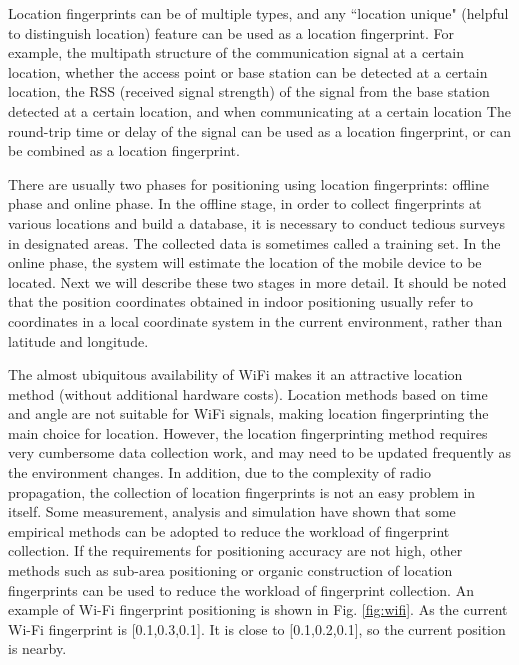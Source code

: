 \documentclass[conference]{IEEEtran}
\begin{document}
Location fingerprints can be of multiple types, and any ``location unique" (helpful to distinguish location) feature can be used as a location fingerprint. For example, the multipath structure of the communication signal at a certain location, whether the access point or base station can be detected at a certain location, the RSS (received signal strength) of the signal from the base station detected at a certain location, and when communicating at a certain location The round-trip time or delay of the signal can be used as a location fingerprint, or can be combined as a location fingerprint.

There are usually two phases for positioning using location fingerprints: offline phase and online phase. In the offline stage, in order to collect fingerprints at various locations and build a database, it is necessary to conduct tedious surveys in designated areas. The collected data is sometimes called a training set. In the online phase, the system will estimate the location of the mobile device to be located. Next we will describe these two stages in more detail. It should be noted that the position coordinates obtained in indoor positioning usually refer to coordinates in a local coordinate system in the current environment, rather than latitude and longitude.

The almost ubiquitous availability of WiFi makes it an attractive location method (without additional hardware costs). Location methods based on time and angle are not suitable for WiFi signals, making location fingerprinting the main choice for location. However, the location fingerprinting method requires very cumbersome data collection work, and may need to be updated frequently as the environment changes. In addition, due to the complexity of radio propagation, the collection of location fingerprints is not an easy problem in itself. Some measurement, analysis and simulation have shown that some empirical methods can be adopted to reduce the workload of fingerprint collection. If the requirements for positioning accuracy are not high, other methods such as sub-area positioning or organic construction of location fingerprints can be used to reduce the workload of fingerprint collection. An example of Wi-Fi fingerprint positioning is shown in Fig. \ref{fig:wifi}. As the current Wi-Fi fingerprint is [0.1,0.3,0.1]. It is close to [0.1,0.2,0.1], so the current position is nearby.
\end{document}
